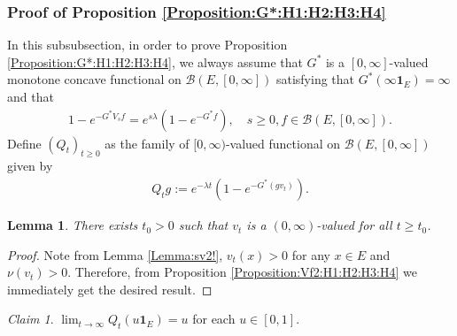 \documentclass[12pt,a4paper]{amsart}
\numberwithin{equation}{section}
\theoremstyle{plain}
\newtheorem{lem}[thm]{Lemma}
\theoremstyle{definition}
\theoremstyle{remark}
\newtheorem{claim}[thm]{Claim}
\begin{document}
\subsubsection{Proof of Proposition \ref{Proposition:G*:H1:H2:H3:H4}}
In this subsubsection, 
 in order to prove
Proposition \ref{Proposition:G*:H1:H2:H3:H4}, we always assume that $G^*$ is a $[0,\infty]$-valued monotone concave functional on $\mathcal B(E,[0,\infty])$ satisfying that $G^*(\infty \mathbf 1_E) = \infty$ and that
\begin{align}
  1 - e^{- G^* V_sf}
  = e^{s\lambda} (1- e^{- G^* f}),
  \quad s \geq 0, f \in \mathcal B(E, [0,\infty]).
  \end{align}
Define $(Q_t)_{t\geq 0}$ as the family of $[0,\infty)$-valued functional on $\mathcal B(E,[0,\infty])$ given by
\begin{align}
 Q_tg
:= e^{- \lambda t}( 1 - e^{-G^*(gv_t)} ).
 \end{align}
\begin{lem} \label{Lemma:vp:H1:H2:H3:H4}
There exists $t_0>0$ such that $v_t$ is a $(0,\infty)$-valued for all $t\ge t_0$.
\end{lem}
\begin{proof}
 Note from Lemma \ref{Lemma:sv2!}, $v_t(x)>0$ for any $x\in E$ and $\nu(v_t)>0$.
Therefore, from Proposition \ref{Proposition:Vf2:H1:H2:H3:H4} 
we immediately get the desired result.
\end{proof}
\begin{claim} \label{Claim:GQ:H1:H2:H3:H4}
 $\lim_{t\to \infty} Q_t(u \mathbf 1_E) = u$ for each $u\in [0,1]$.
\end{claim}
\end{document}
